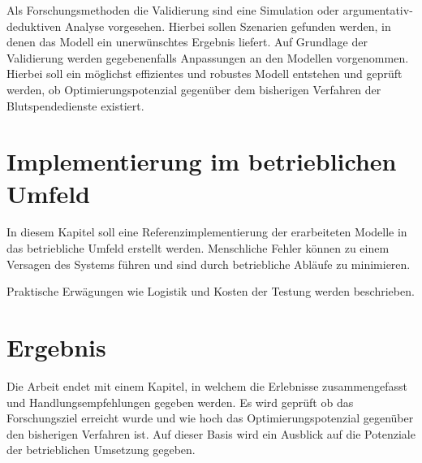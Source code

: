 Als Forschungsmethoden die Validierung sind eine Simulation oder argumentativ-deduktiven Analyse vorgesehen.
Hierbei sollen Szenarien gefunden werden, in denen das Modell ein unerwünschtes Ergebnis liefert.
Auf Grundlage der Validierung werden gegebenenfalls Anpassungen an den Modellen vorgenommen.
Hierbei soll ein möglichst effizientes und robustes Modell entstehen und geprüft werden, ob Optimierungspotenzial gegenüber dem bisherigen Verfahren der Blutspendedienste existiert.

\section{Implementierung im betrieblichen Umfeld}
In diesem Kapitel soll eine Referenzimplementierung der erarbeiteten Modelle in das betriebliche Umfeld erstellt werden.
Menschliche Fehler können zu einem Versagen des Systems führen und sind durch betriebliche Abläufe zu minimieren.

Praktische Erwägungen wie Logistik und Kosten der Testung werden beschrieben.

\section{Ergebnis}
Die Arbeit endet mit einem Kapitel, in welchem die Erlebnisse zusammengefasst und Handlungsempfehlungen gegeben werden.
Es wird geprüft ob das Forschungsziel erreicht wurde und wie hoch das Optimierungspotenzial gegenüber den bisherigen Verfahren ist.
Auf dieser Basis wird ein Ausblick auf die Potenziale der betrieblichen Umsetzung gegeben.

